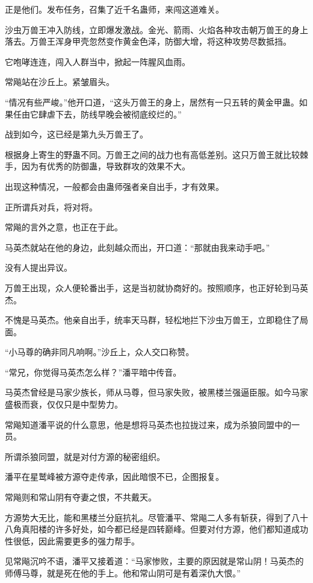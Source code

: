 \begin{this_body}
正是他们。发布任务，召集了近千名蛊师，来闯这道难关。

沙虫万兽王冲入防线，立即爆发激战。金光、箭雨、火焰各种攻击朝万兽王的身上落去。万兽王浑身甲壳忽然变作黄金色泽，防御大增，将这种攻势尽数抵挡。

它咆哮连连，闯入人群当中，掀起一阵腥风血雨。

常飚站在沙丘上。紧皱眉头。

“情况有些严峻。”他开口道，“这头万兽王的身上，居然有一只五转的黄金甲蛊。如果任由它肆虐下去，防线早晚会被彻底绞烂的。”

战到如今，这已经是第九头万兽王了。

根据身上寄生的野蛊不同。万兽王之间的战力也有高低差别。这只万兽王就比较棘手，因为有优秀的防御蛊，导致群攻的效果不大。

出现这种情况，一般都会由蛊师强者亲自出手，才有效果。

正所谓兵对兵，将对将。

常飚的言外之意，也正在于此。

马英杰就站在他的身边，此刻越众而出，开口道：“那就由我来动手吧。”

没有人提出异议。

万兽王出现，众人便轮番出手，这是当初就协商好的。按照顺序，也正好轮到马英杰。

不愧是马英杰。他亲自出手，统率天马群，轻松地拦下沙虫万兽王，立即稳住了局面。

“小马尊的确非同凡响啊。”沙丘上，众人交口称赞。

“常兄，你觉得马英杰怎么样？”潘平暗中传音。

马英杰曾经是马家少族长，师从马尊，但马家失败，被黑楼兰强逼臣服。如今马家盛极而衰，仅仅只是中型势力。

常飚知道潘平说的什么意思，他是想将马英杰也拉拢过来，成为杀狼同盟中的一员。

所谓杀狼同盟，就是对付方源的秘密组织。

潘平在星鹫峰被方源夺走传承，因此暗恨不已，企图报复。

常飚则和常山阴有夺妻之恨，不共戴天。

方源势大无比，能和黑楼兰分庭抗礼。尽管潘平、常飚二人多有斩获，得到了八十八角真阳楼的许多好处，如今都已经是四转巅峰。但要对付方源，他们都知道成功性很低，因此需要更多的强力帮手。

见常飚沉吟不语，潘平又接着道：“马家惨败，主要的原因就是常山阴！马英杰的师傅马尊，就是死在他的手上。他和常山阴可是有着深仇大恨。”


\end{this_body}
